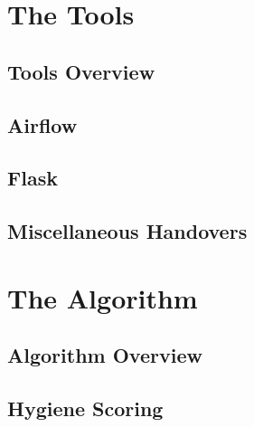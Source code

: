 \part{The Tools}
\newpage
\chapter{Tools Overview} \label{ch:p1_overview}


\newpage
\chapter{Airflow} \label{ch:airflow}

\newpage

\chapter{Flask} \label{ch:flask}

\newpage

\chapter{Miscellaneous Handovers} \label{ch:misc-handovers}

\newpage

\part{The Algorithm}

\chapter{Algorithm Overview}\label{ch:p2_overview}

\newpage

\chapter{Hygiene Scoring}\label{ch:hygiene}

\newpage

